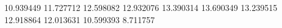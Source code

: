 10.939449
11.727712
12.598082
12.932076
13.390314
13.690349
13.239515
12.918864
12.013631
10.599393
8.711757

